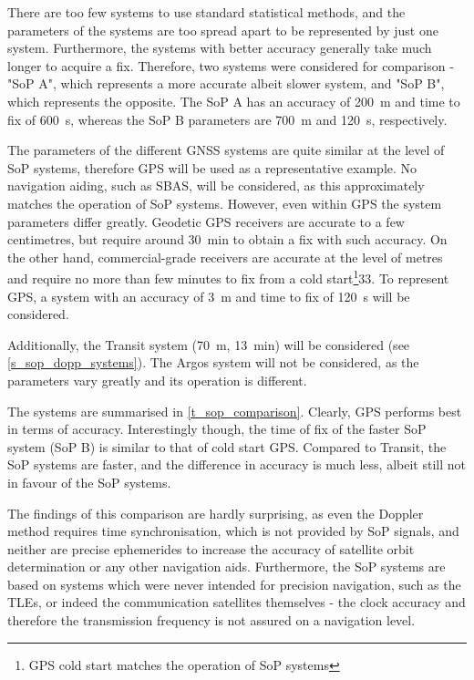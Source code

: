 There are too few systems to use standard statistical methods, and the parameters of the systems are too spread apart to be represented by just one system. Furthermore, the systems with better accuracy generally take much longer to acquire a fix. Therefore, two systems were considered for comparison - "SoP A", which represents a more accurate albeit slower system, and "SoP B", which represents the opposite. The SoP A has an accuracy of \qty{200}{m} and time to fix of \qty{600}{s}, whereas the SoP B parameters are \qty{700}{m} and \qty{120}{s}, respectively.

The parameters of the different GNSS systems are quite similar at the level of SoP systems\cite{sop23}, therefore GPS will be used as a representative example. No navigation aiding, such as SBAS, will be considered, as this approximately matches the operation of SoP systems. However, even within GPS the system parameters differ greatly. Geodetic GPS receivers are accurate to a few centimetres, but require around \qty{30}{min} to obtain a fix with such accuracy\cite{sop23}. On the other hand, commercial-grade receivers are accurate at the level of metres and require no more than few minutes to fix from a cold start\footnote{GPS cold start matches the operation of SoP systems}\citep{pos04}{33}. To represent GPS, a system with an accuracy of \qty{3}{m} and time to fix of \qty{120}{s} will be considered.

Additionally, the Transit system (\qty{70}{m}, \qty{13}{min}) will be considered (see \autoref{s_sop_dopp_systems}). The Argos system will not be considered, as the parameters vary greatly and its operation is different.

The systems are summarised in \autoref{t_sop_comparison}. Clearly, GPS performs best in terms of accuracy. Interestingly though, the time of fix of the faster SoP system (SoP B) is similar to that of cold start GPS. Compared to Transit, the SoP systems are faster, and the difference in accuracy is much less, albeit still not in favour of the SoP systems. 

The findings of this comparison are hardly surprising, as even the Doppler method requires time synchronisation, which is not provided by SoP signals, and neither are precise ephemerides to increase the accuracy of satellite orbit determination or any other navigation aids. Furthermore, the SoP systems are based on systems which were never intended for precision navigation, such as the TLEs, or indeed the communication satellites themselves - the clock accuracy and therefore the transmission frequency is not assured on a navigation level.

